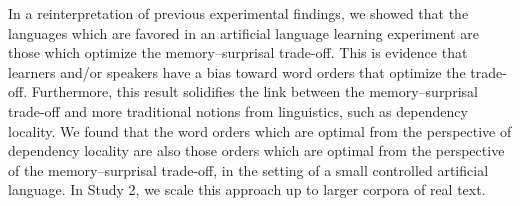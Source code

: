 In a reinterpretation of previous experimental findings, we showed that the languages which are favored in an artificial language learning experiment are those which optimize the memory--surprisal trade-off.
This is evidence that learners and/or speakers have a bias toward word orders that optimize the trade-off. 
Furthermore, this result solidifies the link between the memory--surprisal trade-off and more traditional notions from linguistics, such as dependency locality. 
We found that the word orders which are optimal from the perspective of dependency locality are also those orders which are optimal from the perspective of the memory--surprisal trade-off, in the setting of a small controlled artificial language.
In Study 2, we scale this approach up to larger corpora of real text.
